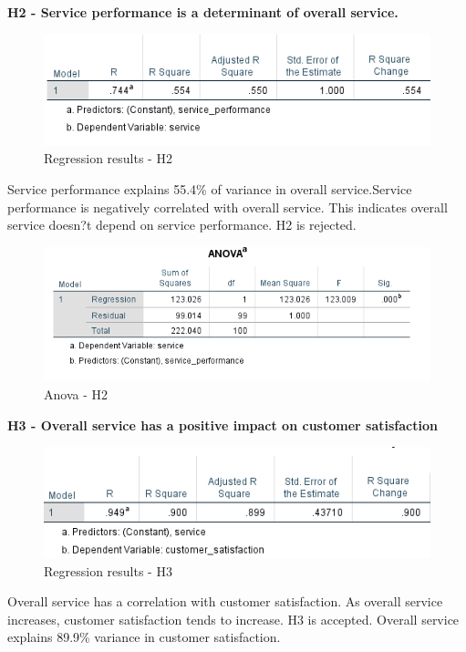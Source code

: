 \documentclass[a4paper, 14pt]{article}
\begin{document}
{\par \textbf{H2 - Service performance is a determinant of overall service.}\\
\begin{figure}[H]
\centering
\includegraphics[scale=1]{service_performance_vs_service.png}
\caption{Regression results - H2}
\end{figure}

Service performance explains 55.4\% of variance in overall service.Service performance is negatively correlated with overall service. This indicates overall service doesn?t depend on service performance. H2 is rejected.

\begin{figure}[H]
\centering
\includegraphics[scale=1]{anova_s_sp.png}
\caption{Anova - H2}
\end{figure}

\par \textbf{H3 - Overall service has a positive impact on customer satisfaction}\\
\begin{figure}[H]
\centering
\includegraphics[scale=1]{sp_vs_cs.png}
\caption{Regression results - H3}
\end{figure}

Overall service has a correlation with customer satisfaction. As overall service increases, customer satisfaction tends to increase. H3 is accepted.
Overall service explains 89.9\% variance in customer satisfaction.

}
\end{document}

